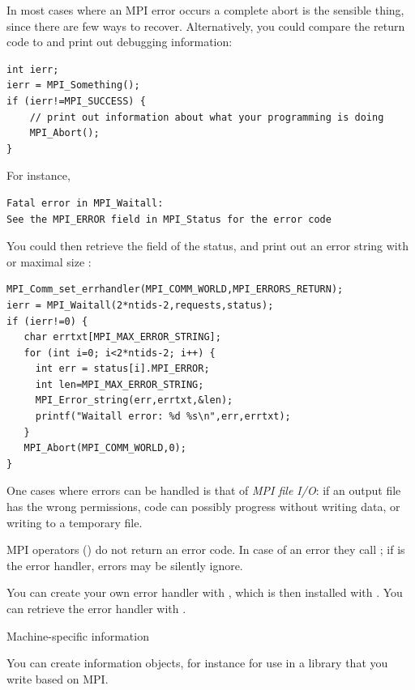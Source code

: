 In most cases where an MPI error occurs a complete abort is the
sensible thing, since there are few ways to recover.
Alternatively, you could compare the return code to 
and  print out debugging information:
\begin{lstlisting}
int ierr;
ierr = MPI_Something();
if (ierr!=MPI_SUCCESS) {
    // print out information about what your programming is doing
    MPI_Abort();
}
\end{lstlisting}
For instance,
\begin{verbatim}
Fatal error in MPI_Waitall: 
See the MPI_ERROR field in MPI_Status for the error code
\end{verbatim}
You could then retrieve the  field of the
status, and print out an error string with
or maximal size :
\begin{lstlisting}
MPI_Comm_set_errhandler(MPI_COMM_WORLD,MPI_ERRORS_RETURN);
ierr = MPI_Waitall(2*ntids-2,requests,status);
if (ierr!=0) {
   char errtxt[MPI_MAX_ERROR_STRING];
   for (int i=0; i<2*ntids-2; i++) {
     int err = status[i].MPI_ERROR;
     int len=MPI_MAX_ERROR_STRING;
     MPI_Error_string(err,errtxt,&len);
     printf("Waitall error: %d %s\n",err,errtxt);
   }
   MPI_Abort(MPI_COMM_WORLD,0);
}
\end{lstlisting}
One cases where errors can be handled is that of \emph{MPI file
  I/O}: if an output file has the wrong
permissions, code can possibly progress without writing data, or
writing to a temporary file.

MPI operators () do not return an error code. In case of
an error they call ; if 
is the error handler, errors may be silently ignore.

You can create your own error handler with
, which is then installed with
. You can retrieve the error
handler with .

 {Machine-specific information}
\label{sec:mpi-info}

You can create information objects, for instance for use in a library
that you write based on MPI.


